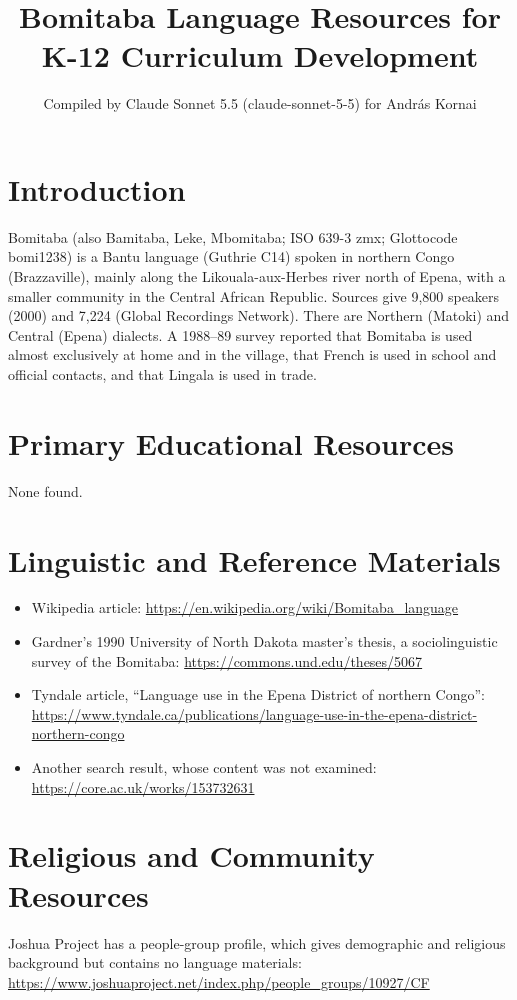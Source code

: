 \documentclass[12pt]{article}
\title{Bomitaba Language Resources for K-12 Curriculum Development}
\author{Compiled by Claude Sonnet 5.5 (claude-sonnet-5-5) for Andr\'as Kornai}
\date{}
\begin{document}
\maketitle

\section{Introduction}
Bomitaba (also Bamitaba, Leke, Mbomitaba; ISO 639-3 zmx; Glottocode bomi1238) is a Bantu language (Guthrie C14) spoken in northern Congo (Brazzaville), mainly along the Likouala-aux-Herbes river north of Epena, with a smaller community in the Central African Republic. Sources give 9,800 speakers (2000) and 7,224 (Global Recordings Network). There are Northern (Matoki) and Central (Epena) dialects. A 1988--89 survey reported that Bomitaba is used almost exclusively at home and in the village, that French is used in school and official contacts, and that Lingala is used in trade.

\section{Primary Educational Resources}
None found.

\section{Linguistic and Reference Materials}
\begin{itemize}
\item Wikipedia article: \url{https://en.wikipedia.org/wiki/Bomitaba_language}
\item Gardner's 1990 University of North Dakota master's thesis, a sociolinguistic survey of the Bomitaba: \url{https://commons.und.edu/theses/5067}
\item Tyndale article, ``Language use in the Epena District of northern Congo'': \url{https://www.tyndale.ca/publications/language-use-in-the-epena-district-northern-congo}
\item Another search result, whose content was not examined: \url{https://core.ac.uk/works/153732631}
\end{itemize}

\section{Religious and Community Resources}
Joshua Project has a people-group profile, which gives demographic and religious background but contains no language materials: \url{https://www.joshuaproject.net/index.php/people_groups/10927/CF}
\end{document}
